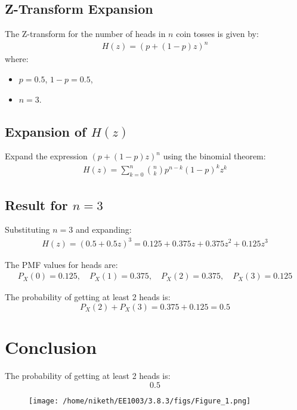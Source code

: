 \documentclass[journal]{IEEEtran}
\begin{document}
\subsection*{Z-Transform Expansion}
The Z-transform for the number of heads in \(n\) coin tosses is given by:
\begin{align}
H(z) = \left( p + (1-p)z \right)^n
\end{align}
where:
\begin{itemize}
    \item \(p = 0.5\), \(1-p = 0.5\),
    \item \(n = 3\).
\end{itemize}

\subsection*{Expansion of \(H(z)\)}
Expand the expression \(\left( p + (1-p)z \right)^n\) using the binomial theorem:
\begin{align}
H(z) = \sum_{k=0}^{n} \binom{n}{k} p^{n-k} (1-p)^k z^k
\end{align}

\subsection*{Result for \(n = 3\)}
Substituting \(n = 3\) and expanding:
\begin{align}
H(z) = (0.5 + 0.5z)^3 = 0.125 + 0.375z + 0.375z^2 + 0.125z^3
\end{align}

The PMF values for heads are:
\begin{align}
P_X(0) = 0.125, \quad P_X(1) = 0.375, \quad P_X(2) = 0.375, \quad P_X(3) = 0.125
\end{align}

The probability of getting at least 2 heads is:
\[
P_X(2) + P_X(3) = 0.375 + 0.125 = 0.5
\]

\section*{Conclusion}
The probability of getting at least 2 heads is:
\[
\boxed{0.5}
\]
	\begin{figure}[h!]
		\centering
		\texttt{[image: /home/niketh/EE1003/3.8.3/figs/Figure\_1.png]}
		\label{stemplot}
	\end{figure}
\end{document}
